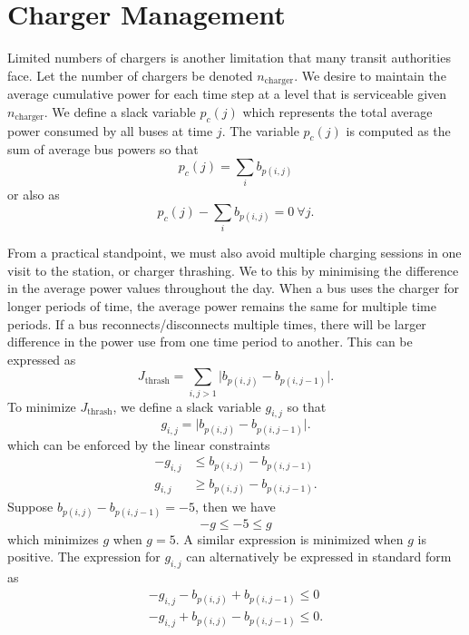 \section{Charger Management}
\par Limited numbers of chargers is another limitation that many transit authorities face.  Let the number of chargers be denoted $n_{\text{charger}}$. We desire to maintain the average cumulative power for each time step at a level that is serviceable given $n_{\text{charger}}$. We define a slack variable $p_c(j)$ which represents the total average power consumed by all buses at time $j$.  The variable $p_c(j)$ is computed as the sum of average bus powers so that
\begin{equation*}
	p_c(j) = \sum_ib_{p(i,j)}
\end{equation*}
or also as 
\begin{equation}
p_c(j) - \sum_ib_{p(i,j)}  = 0\ \forall j.
\end{equation}
\par From a practical standpoint, we must also avoid multiple charging sessions in one visit to the station, or charger thrashing. We to this by minimising the difference in the average power values throughout the day.  When a bus uses the charger for longer periods of time, the average power remains the same for multiple time periods.  If a bus reconnects/disconnects multiple times, there will be larger difference in the power use from one time period to another. This can be expressed as
\begin{equation}
	J_{\text{thrash}} = \sum_{i,j > 1} \lvert b_{p(i,j)} - b_{p(i,j-1)}\rvert.
\end{equation}
To minimize $J_{\text{thrash}}$, we define a slack variable $g_{i,j}$ so that 
\begin{equation*}
g_{i,j} = \lvert b_{p(i,j)} - b_{p(i,j-1)} \rvert.
\end{equation*}
which can be enforced by the linear constraints 
\begin{equation*}\begin{aligned}
	-g_{i,j} &\le b_{p(i,j)} - b_{p(i,j-1)} \\
	g_{i,j} &\ge b_{p(i,j)} - b_{p(i,j-1)}.
\end{aligned}\end{equation*}
Suppose $b_{p(i,j)} - b_{p(i,j-1)} = -5$, then we have 
\begin{equation*}
	-g \le -5 \le g
\end{equation*}
which minimizes $g$ when $g = 5$. A similar expression is minimized when $g$ is positive. The expression for $g_{i,j}$ can alternatively be expressed in standard form as
\begin{equation}\begin{aligned}
-g_{i,j} - b_{p(i,j)} + b_{p(i,j-1)} \le 0 \\
-g_{i,j} + b_{p(i,j)} - b_{p(i,j-1)} \le 0.
\end{aligned}\end{equation}

